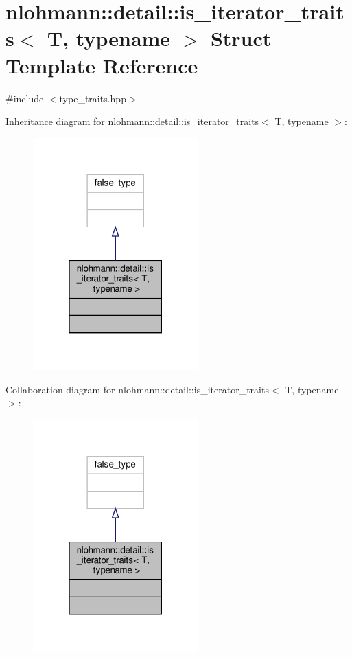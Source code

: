 \hypertarget{structnlohmann_1_1detail_1_1is__iterator__traits}{}\section{nlohmann\+:\+:detail\+:\+:is\+\_\+iterator\+\_\+traits$<$ T, typename $>$ Struct Template Reference}
\label{structnlohmann_1_1detail_1_1is__iterator__traits}


{\ttfamily \#include $<$type\+\_\+traits.\+hpp$>$}



Inheritance diagram for nlohmann\+:\+:detail\+:\+:is\+\_\+iterator\+\_\+traits$<$ T, typename $>$\+:\nopagebreak
\begin{figure}[H]
\begin{center}
\leavevmode
\includegraphics[width=181pt]{structnlohmann_1_1detail_1_1is__iterator__traits__inherit__graph}
\end{center}
\end{figure}


Collaboration diagram for nlohmann\+:\+:detail\+:\+:is\+\_\+iterator\+\_\+traits$<$ T, typename $>$\+:\nopagebreak
\begin{figure}[H]
\begin{center}
\leavevmode
\includegraphics[width=181pt]{structnlohmann_1_1detail_1_1is__iterator__traits__coll__graph}
\end{center}
\end{figure}


